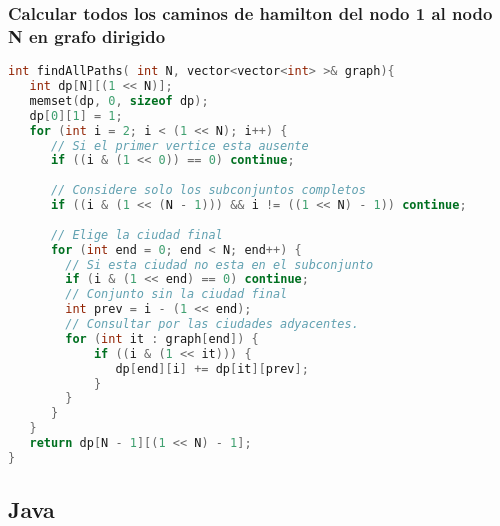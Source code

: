 \subsubsection{Calcular todos los caminos de hamilton del nodo 1 al nodo N en grafo dirigido}
\begin{lstlisting}[language=C++]
int findAllPaths( int N, vector<vector<int> >& graph){
   int dp[N][(1 << N)];
   memset(dp, 0, sizeof dp);
   dp[0][1] = 1;
   for (int i = 2; i < (1 << N); i++) {
      // Si el primer vertice esta ausente
      if ((i & (1 << 0)) == 0) continue;
      
      // Considere solo los subconjuntos completos
      if ((i & (1 << (N - 1))) && i != ((1 << N) - 1)) continue;
		
      // Elige la ciudad final
      for (int end = 0; end < N; end++) {
        // Si esta ciudad no esta en el subconjunto
        if (i & (1 << end) == 0) continue;
        // Conjunto sin la ciudad final
        int prev = i - (1 << end);
        // Consultar por las ciudades adyacentes.
        for (int it : graph[end]) {
            if ((i & (1 << it))) {
               dp[end][i] += dp[it][prev];
            }
        }
      }
   }
   return dp[N - 1][(1 << N) - 1];
}
\end{lstlisting}

\subsection{Java}

